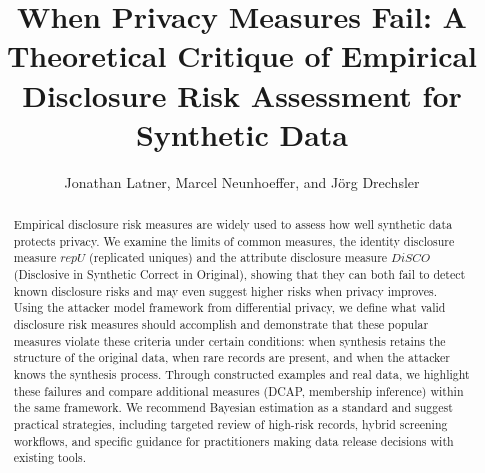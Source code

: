 \documentclass[Afour,sageh,times,doublespace]{sagej}
\begin{document}

\title{When Privacy Measures Fail: A Theoretical Critique of Empirical Disclosure Risk Assessment for Synthetic Data}

\author{Jonathan Latner, Marcel Neunhoeffer, and Jörg Drechsler}




\begin{abstract}
Empirical disclosure risk measures are widely used to assess how well synthetic data protects privacy. We examine the limits of common measures, the identity disclosure measure $repU$ (replicated uniques) and the attribute disclosure measure $DiSCO$ (Disclosive in Synthetic Correct in Original), showing that they can both fail to detect known disclosure risks and may even suggest higher risks when privacy improves. Using the attacker model framework from differential privacy, we define what valid disclosure risk measures should accomplish and demonstrate that these popular measures violate these criteria under certain conditions: when synthesis retains the structure of the original data, when rare records are present, and when the attacker knows the synthesis process. Through constructed examples and real data, we highlight these failures and compare additional measures (DCAP, membership inference) within the same framework. We recommend Bayesian estimation as a standard and suggest practical strategies, including targeted review of high-risk records, hybrid screening workflows, and specific guidance for practitioners making data release decisions with existing tools.
\end{abstract}


\maketitle
\end{document}
